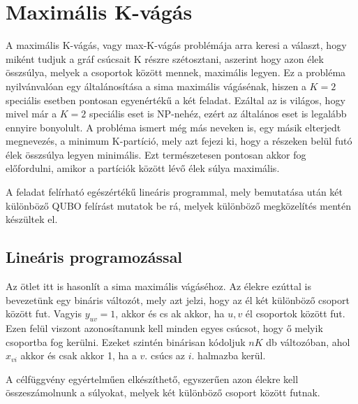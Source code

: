 \section{Maximális K-vágás}\label{sec:theoryMaxKCut}

A maximális K-vágás, vagy max-K-vágás problémája arra keresi a választ, hogy miként tudjuk a gráf csúcsait K részre szétosztani, aszerint hogy azon élek összsúlya, melyek a csoportok között mennek, maximális legyen. Ez a probléma nyilvánvalóan egy általánosítása a sima maximális vágásénak, hiszen a $K=2$ speciális esetben pontosan egyenértékű a két feladat. Ezáltal az is világos, hogy mivel már a $K=2$ speciális eset is NP-nehéz, ezért az általános eset is legalább ennyire bonyolult.
A probléma ismert még más neveken is, egy másik elterjedt megnevezés, a minimum K-partíció, mely azt fejezi ki, hogy a részeken belül futó élek összsúlya legyen minimális. Ezt természetesen pontosan akkor fog előfordulni, amikor a partíciók között lévő élek súlya maximális.

A feladat felírható egészértékű lineáris programmal, mely bemutatása után két különböző QUBO felírást mutatok be rá, melyek különböző megközelítés mentén készültek el.

\subsection{Lineáris programozással}\label{sec:theoryMaxKCutLP}

Az ötlet itt is hasonlít a sima maximális vágáséhoz. Az élekre ezúttal is bevezetünk egy bináris változót, mely azt jelzi, hogy az él két különböző csoport között fut. Vagyis $y_{uv}=1$, akkor és cs
ak akkor, ha $u, v$ él csoportok között fut. Ezen felül viszont azonosítanunk kell minden egyes csúcsot, hogy ő melyik csoportba fog kerülni. Ezeket szintén binárisan kódoljuk $nK$ db változóban, ahol $x_{vi}$ akkor és csak akkor 1, ha a $v.$ csúcs az $i.$ halmazba kerül. 

A célfüggvény egyértelműen elkészíthető, egyszerűen azon élekre kell összeszámolnunk a súlyokat, melyek két különböző csoport között futnak.

